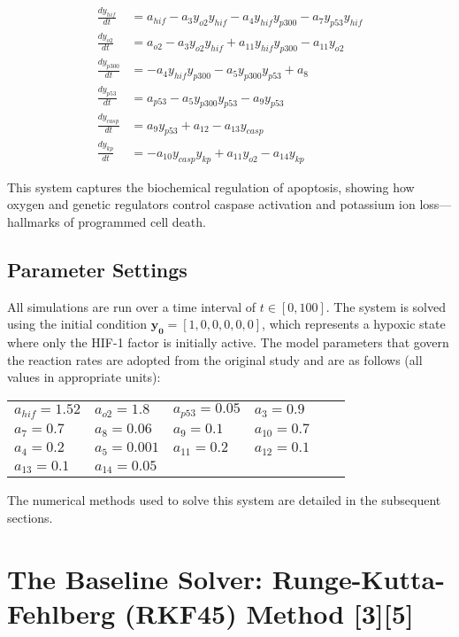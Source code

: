 \documentclass[conference]{IEEEtran}
\begin{document}
\begin{align}
\frac{dy_{hif}}{dt} &= a_{hif} - a_3 y_{o2} y_{hif} - a_4 y_{hif} y_{p300} - a_7 y_{p53} y_{hif} \\
\frac{dy_{o2}}{dt} &= a_{o2} - a_3 y_{o2} y_{hif} + a_{11} y_{hif} y_{p300} - a_{11} y_{o2} \\
\frac{dy_{p300}}{dt} &= -a_4 y_{hif} y_{p300} - a_5 y_{p300} y_{p53} + a_8 \\
\frac{dy_{p53}}{dt} &= a_{p53} - a_5 y_{p300} y_{p53} - a_9 y_{p53} \\
\frac{dy_{casp}}{dt} &= a_9 y_{p53} + a_{12} - a_{13} y_{casp} \\
\frac{dy_{kp}}{dt} &= -a_{10} y_{casp} y_{kp} + a_{11} y_{o2} - a_{14} y_{kp}
\end{align}

This system captures the biochemical regulation of apoptosis, showing how oxygen and genetic regulators control caspase activation and potassium ion loss—hallmarks of programmed cell death.

\subsection{Parameter Settings}
All simulations are run over a time interval of $t \in [0, 100]$. The system is solved using the initial condition $\mathbf{y_0} = [1, 0, 0, 0, 0, 0]$, which represents a hypoxic state where only the HIF-1 factor is initially active. The model parameters that govern the reaction rates are adopted from the original study and are as follows (all values in appropriate units):

\begin{center}
\begin{tabular}{llllll}
$a_{hif} = 1.52$ & $a_{o2} = 1.8$ & $a_{p53} = 0.05$ & $a_3 = 0.9$  \\
$a_7 = 0.7$ & $a_8 = 0.06$ & $a_9 = 0.1$ & $a_{10} = 0.7$  \\
$a_4 = 0.2$ & $a_5 = 0.001$ & $a_{11} = 0.2$ & $a_{12} = 0.1$ \\
$a_{13} = 0.1$ & $a_{14} = 0.05$ \\
\end{tabular}
\end{center}

The numerical methods used to solve this system are detailed in the subsequent sections.

\section{The Baseline Solver: Runge-Kutta-Fehlberg (RKF45) Method [3][5]}
\end{document}
